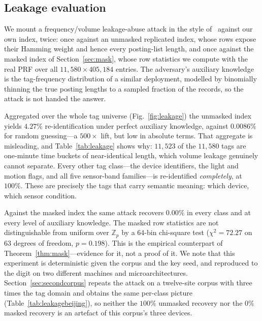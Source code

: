 \documentclass[journal]{IEEEtran}
\begin{document}
\subsection{Leakage evaluation}
\label{sec:leakeval}
We mount a frequency/volume leakage-abuse attack in the style
of~\cite{islam2012access,cash2015leakage} against our own index, twice: once
against an unmasked replicated index, whose rows expose their Hamming weight and
hence every posting-list length, and once against the masked index of
Section~\ref{sec:mask}, whose row statistics we compute with the real PRF over
all $11{,}580\times405{,}184$ entries. The adversary's auxiliary knowledge is
the tag-frequency distribution of a similar deployment, modelled by binomially
thinning the true posting lengths to a sampled fraction of the records, so the
attack is not handed the answer.

Aggregated over the whole tag universe (Fig.~\ref{fig:leakage}) the unmasked
index yields $4.27\%$ re-identification under perfect auxiliary knowledge,
against $0.0086\%$ for random guessing---a $500\times$ lift, but low in absolute
terms. That aggregate is misleading, and Table~\ref{tab:leakage} shows why:
$11{,}523$ of the $11{,}580$ tags are one-minute time buckets of near-identical
length, which volume leakage genuinely cannot separate. Every other tag
class---the device identifiers, the light and motion flags, and all five
sensor-band families---is re-identified \emph{completely}, at $100\%$. These are
precisely the tags that carry semantic meaning: which device, which sensor
condition.

Against the masked index the same attack recovers $0.00\%$ in every class and at
every level of auxiliary knowledge. The masked row statistics are not
distinguishable from uniform over $\mathbb{Z}_p$ by a $64$-bin chi-square test
($\chi^2=72.27$ on $63$ degrees of freedom, $p=0.198$). This is the empirical
counterpart of Theorem~\ref{thm:mask}---evidence for it, not a proof of it. We
note that this experiment is deterministic given the corpus and the key seed,
and reproduced to the digit on two different machines and microarchitectures.
Section~\ref{sec:secondcorpus} repeats the attack on a twelve-site corpus with
three times the tag domain and obtains the same per-class picture
(Table~\ref{tab:leakagebeijing}), so neither the $100\%$ unmasked recovery nor
the $0\%$ masked recovery is an artefact of this corpus's three devices.
\end{document}
